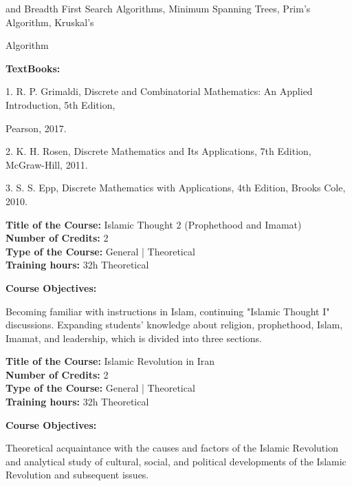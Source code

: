 \documentclass[12pt,a4paper]{article}
\begin{document}
and Breadth First Search Algorithms, Minimum Spanning Trees, Prim’s Algorithm, Kruskal’s\par
Algorithm\par\vspace{4pt}
\textbf{TextBooks:}\par\vspace{2pt}
1. R. P. Grimaldi, Discrete and Combinatorial Mathematics: An Applied Introduction, 5th Edition,\par
Pearson, 2017.\par
2. K. H. Rosen, Discrete Mathematics and Its Applications, 7th Edition, McGraw-Hill, 2011.\par
3. S. S. Epp, Discrete Mathematics with Applications, 4th Edition, Brooks Cole, 2010.\par
\vspace{4pt}

\newpage
\nopagebreak
\textbf{Title of the Course:} Islamic Thought 2 (Prophethood and Imamat)\\
\textbf{Number of Credits:} 2\\
\textbf{Type of the Course:} General | Theoretical\\
\textbf{Training hours:} 32h Theoretical\par\vspace{4pt}
\textbf{Course Objectives:}\par\vspace{2pt}
Becoming familiar with instructions in Islam, continuing "Islamic Thought I" discussions.
Expanding students' knowledge about religion, prophethood, Islam, Imamat, and leadership,
which is divided into three sections.\par\vspace{4pt}

\par\vspace{14pt}
\nopagebreak
\textbf{Title of the Course:} Islamic Revolution in Iran\\
\textbf{Number of Credits:} 2\\
\textbf{Type of the Course:} General | Theoretical\\
\textbf{Training hours:} 32h Theoretical\par\vspace{4pt}
\textbf{Course Objectives:}\par\vspace{2pt}
Theoretical acquaintance with the causes and factors of the Islamic Revolution and analytical study
of cultural, social, and political developments of the Islamic Revolution and subsequent issues.\par\vspace{4pt}
\end{document}
